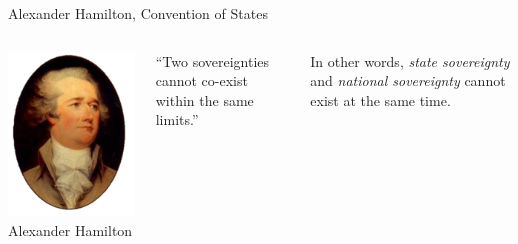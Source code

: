 \begin{frame}{Alexander Hamilton, Convention of States}
    \begin{columns}[onlytextwidth]
            \centering
            \includegraphics[height=0.75\textheight]{img/hamilton.png} \\
            Alexander Hamilton \\

            \begin{block}{}
                ``Two sovereignties cannot co-exist within the same limits.''
            \end{block}
            \pause
            \vspace{15pt}
            In other words, \emph{state sovereignty} and \emph{national sovereignty} cannot exist at the same time.
    \end{columns}
\end{frame}


